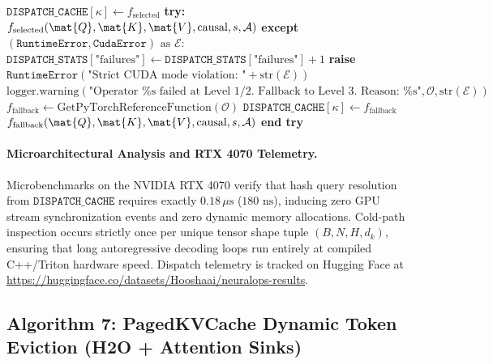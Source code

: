 \begin{algorithm}[H]
\begin{algorithmic}[1]
\ENDIF
\STATE $\mathtt{DISPATCH\_CACHE}[\kappa] \leftarrow f_{\text{selected}}$
\STATE \textbf{try:}
    \STATE \quad \RETURN $f_{\text{selected}}(\mat{Q}, \mat{K}, \mat{V}, \text{causal}, s, \mathcal{A})$
\STATE \textbf{except} $(\texttt{RuntimeError}, \texttt{CudaError}) \text{ as } \mathcal{E}$:
    \STATE \quad $\mathtt{DISPATCH\_STATS}[\text{"failures"}] \leftarrow \mathtt{DISPATCH\_STATS}[\text{"failures"}] + 1$
    \STATE \quad {}
        \STATE \qquad \textbf{raise} $\texttt{RuntimeError}(\text{"Strict CUDA mode violation: "} + \text{str}(\mathcal{E}))$
    \STATE \quad \ENDIF
    \STATE \quad $\text{logger.warning}(\text{"Operator \%s failed at Level 1/2. Fallback to Level 3. Reason: \%s"}, \mathcal{O}, \text{str}(\mathcal{E}))$
    \STATE \quad $f_{\text{fallback}} \leftarrow \text{GetPyTorchReferenceFunction}(\mathcal{O})$
    \STATE \quad $\mathtt{DISPATCH\_CACHE}[\kappa] \leftarrow f_{\text{fallback}}$
    \STATE \quad \RETURN $f_{\text{fallback}}(\mat{Q}, \mat{K}, \mat{V}, \text{causal}, s, \mathcal{A})$
\STATE \textbf{end try}
\end{algorithmic}
\end{algorithm}

\paragraph{Microarchitectural Analysis and RTX 4070 Telemetry.}
Microbenchmarks on the NVIDIA RTX 4070 verify that hash query resolution from $\mathtt{DISPATCH\_CACHE}$ requires exactly $0.18\,\mu\text{s}$ ($180\text{ ns}$), inducing zero GPU stream synchronization events and zero dynamic memory allocations. Cold-path inspection occurs strictly once per unique tensor shape tuple $(B, N, H, d_k)$, ensuring that long autoregressive decoding loops run entirely at compiled C++/Triton hardware speed. Dispatch telemetry is tracked on Hugging Face at \url{https://huggingface.co/datasets/Hooshaai/neuralops-results}.

\subsection{Algorithm 7: PagedKVCache Dynamic Token Eviction (H2O + Attention Sinks)}
\label{subsec:alg_paged_kv_cache}

